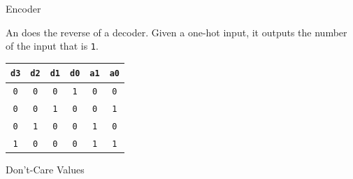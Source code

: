 \documentclass[mathserif, handout]{beamer}
\newcommand{\ttab}[1]{\texttt{#1}}
\begin{document}
\begin{frame}{Encoder}
  \begin{center}
    \Large {}
  \end{center}
\end{frame}

\begin{frame}
  An  does the reverse of a decoder. Given a one-hot input, it outputs the number of the input that is \ttab{1}.\\[3mm]
  \begin{minipage}{0.45\textwidth}
    \centering
  \end{minipage}%
  \begin{minipage}{0.55\textwidth}
    \centering
    \renewcommand{\arraystretch}{1.2}
    \begin{tabular}{cccc|cc}
      \ttab{d3} & \ttab{d2} & \ttab{d1} & \ttab{d0} & \ttab{a1} & \ttab{a0} \\ \hline
      \ttab{0} & \ttab{0} & \ttab{0} & \ttab{1} & \ttab{0} & \ttab{0} \\
      \ttab{0} & \ttab{0} & \ttab{1} & \ttab{0} & \ttab{0} & \ttab{1} \\
      \ttab{0} & \ttab{1} & \ttab{0} & \ttab{0} & \ttab{1} & \ttab{0} \\
      \ttab{1} & \ttab{0} & \ttab{0} & \ttab{0} & \ttab{1} & \ttab{1} \\
    \end{tabular}
  \end{minipage}
\end{frame}

\begin{frame}{Don't-Care Values}
  \begin{center}
    \Large {}
  \end{center}
\end{frame}
\end{document}
